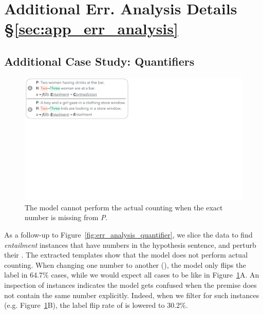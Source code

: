 \section{Additional Err. Analysis Details \S\ref{sec:app_err_analysis}}
\label{appendix:err_analysis}

\subsection{Additional Case Study: Quantifiers}
\label{appendix:err_analysis_quantifier_case}

\begin{figure}[t]
\centering
\includegraphics[trim={0 25.2cm 34.5cm 0cm},clip,width=1\columnwidth]{figures/err_analysis_two_three}
\vspace{-20pt}
\caption{
The \nli model cannot perform the actual counting when the exact number is missing from \emph{P}.
}
\vspace{-15pt}
\label{fig:err_analysis_two_three}
\end{figure}



As a follow-up to Figure~\ref{fig:err_analysis_quantifier}, we slice the data to find \emph{entailment} instances that have numbers in the hypothesis sentence, and perturb their .
The extracted templates show that the model does not perform actual counting. 
When changing one number to another (), the model only flips the label in 64.7\% cases, while we would expect all cases to be like in Figure~\ref{fig:err_analysis_two_three}A.
An inspection of instances indicates the model gets confused when the premise does not contain the same number explicitly. 
Indeed, when we filter for such instances (e.g. Figure~\ref{fig:err_analysis_two_three}B), the label flip rate of  is lowered to 30.2\%.

